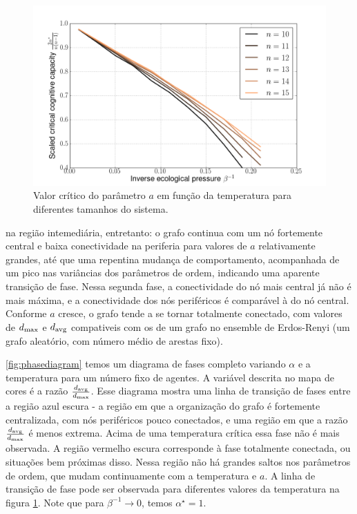 \begin{figure}
	\includegraphics[width = 1.15\textwidth]{figuras/critical.png}
 	\caption{\label{fig:critical} Valor crítico do parâmetro $a$ em função da temperatura para diferentes tamanhos do sistema.}
\end{figure}	

 na região intemediária, entretanto: o grafo continua com um nó fortemente central e baixa conectividade na periferia para valores de $a$ relativamente grandes, até que uma repentina mudança de comportamento, acompanhada de um pico nas variâncias dos parâmetros de ordem, indicando uma aparente transição de fase. Nessa segunda fase, a conectividade do nó mais central já não é mais máxima, e a conectividade dos nós periféricos é comparável à do nó central. Conforme $a$ cresce, o grafo tende a se tornar totalmente conectado, com valores de $d_{\text{max}}$ e $d_{\text{avg}}$ compativeis com os de um grafo no ensemble de Erdos-Renyi (um grafo aleatório, com número médio de arestas fixo).


\ref{fig:phasediagram} temos um diagrama de fases completo variando $\alpha$ e a temperatura para um número fixo de agentes. A variável descrita no mapa de cores é a razão $\frac{d_{\text{avg}}}{d_{\text{max}}}$. Esse diagrama mostra uma linha de transição de fases entre a região azul escura - a região em que a organização do grafo é fortemente centralizada, com nós periféricos pouco conectados, e uma região em que a razão $\frac{d_{\text{avg}}}{d_{\text{max}}}$ é menos extrema. Acima de uma temperatura crítica essa fase não é mais observada. A região vermelho escura corresponde à fase totalmente conectada, ou situações bem próximas disso. Nessa região não há grandes saltos nos parâmetros de ordem, que mudam continuamente com a temperatura e $a$. A linha de transição de fase pode ser observada para diferentes valores da temperatura na figura \ref{fig:critical}. Note que para $\beta^{-1} \to 0$, temos $\alpha^{\star} = 1$.


